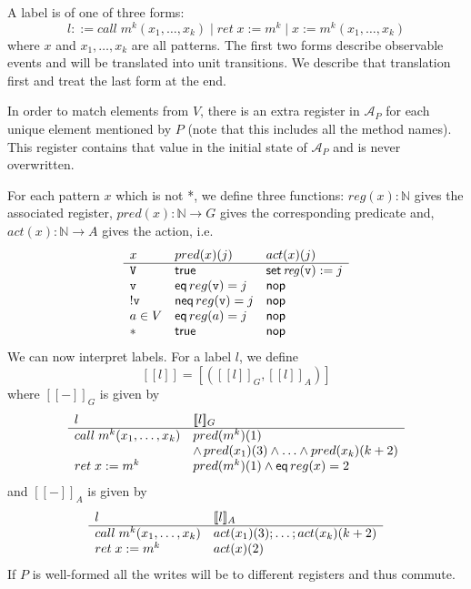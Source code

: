 \documentclass[9pt, preprint]{sigplanconf} %
\newcommand{\N}{\ensuremath{\mathbb{N}}}
\newcommand{\A}{\ensuremath{\mathcal{A}}}
\theoremstyle{definition}
\theoremstyle{remark}
\begin{document}
A label is of one of three forms:
\[
  l ::=
  call\;m^k(x_1, \ldots, x_k) \mid
  ret\;x := m^k \mid
  x := m^k(x_1, \ldots, x_k)
\]
where $x$ and $x_1, \ldots, x_k$ are all patterns.
The first two forms describe observable events and will be translated
into unit transitions. We describe that translation first and treat
the last form at the end.

In order to match elements from $V$, there is an extra register in
$\A_P$ for each unique element mentioned by $P$ (note that this
includes all the method names). This register contains
that value in the initial state of $\A_P$ and is never overwritten.

For each pattern $x$ which is not *, we define three functions:
$reg(x) : \N$ gives the associated register, $pred(x) : \N\to G$ gives
the corresponding predicate and, $act(x) : \N\to A$ gives the action, i.e.
\[
\begin{array}{l l l}
  x & pred(x)(j) & act(x)(j) \\
  \hline
  \mathtt{V} & {\sf true} & {\sf set}\,{\it reg}({\tt v}):=j \\
  \mathtt{v} & {\sf eq}\,reg(\mathtt{v})=j & {\sf nop} \\
  \mathtt{!v} & {\sf neq}\,reg(\mathtt{v})=j  & {\sf nop}  \\
  a\in V & {\sf eq}\,reg(a)=j  & {\sf nop}  \\
  * & {\sf true} & {\sf nop}  \\
\end{array}
\]
We can now interpret labels.
\newcommand{\den}[1]{[\![#1]\!]}
\newcommand{\denG}[1]{\den{#1}_G}
\newcommand{\denA}[1]{\den{#1}_A}
For a label $l$, we define
\[
\den{l} = [(\denG{l}, \denA{l})]
\]
where $\denG-$ is given by
\[
\begin{array}{l l}
  l & \denG l \\
  \hline
  call\;m^k(x_1, \ldots, x_k) & pred(m^k)(1) \\
                                           & \land\,pred(x_1)(3) \land\ldots\land pred(x_k)(k+2) \\
  ret\;x := m^k & pred(m^k)(1) \land {\sf eq}\,reg(x) = 2 \\
\end{array}
\]
and $\denA-$ is given by
\[
\begin{array}{l l l}
  l & \denA l \\
  \hline
  call\;m^k(x_1, \ldots, x_k) & act(x_1)(3); \dots; act(x_k)(k+2) \\
  ret\;x := m^k & act(x)(2) \\
\end{array}
\]
If $P$ is well-formed all the writes will be to different registers
and thus commute.
\end{document}
